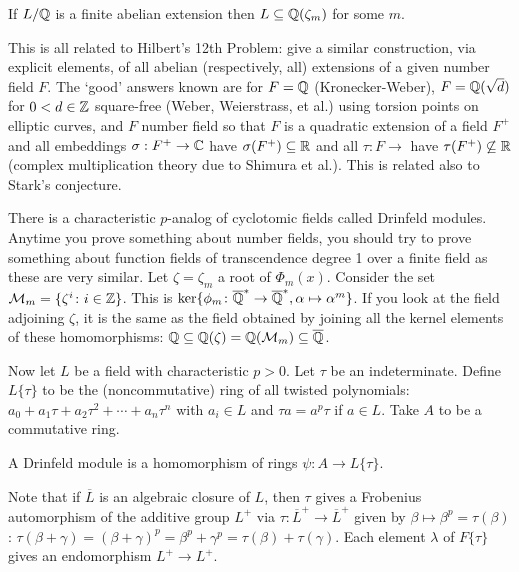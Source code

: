 \begin{thm}
If $L/\mathbb{Q}$ is a finite abelian extension then $L \subseteq \mathbb{Q}(\zeta_m)$ for some $m$.
\end{thm}


This is all related to Hilbert's 12th Problem: give a similar construction, via explicit elements, of all abelian (respectively, all) extensions of a given number field $F$. The `good' answers known are for $F=\mathbb{Q}$ (Kronecker-Weber), $F=\mathbb{Q}(\sqrt{d})$ for $0<d \in \mathbb{Z}$ square-free (Weber, Weierstrass, et al.) using torsion points on elliptic curves, and $F$ number field so that $F$ is a quadratic extension of a field $F^+$ and all embeddings $\sigma: F^+ \to \mathbb{C}$ have $\sigma(F^+) \subseteq \mathbb{R}$ and all $\tau: F \to$ have $\tau(F^+)\not\subseteq \mathbb{R}$ (complex multiplication theory due to Shimura et al.). This is related also to Stark's conjecture. 


There is a characteristic $p$-analog of cyclotomic fields called Drinfeld modules. Anytime you prove something about number fields, you should try to prove something about function fields of transcendence degree 1 over a finite field as these are very similar. Let $\zeta=\zeta_m$ a root of $\Phi_m(x)$. Consider the set $\mathcal{M}_m=\{\zeta^i \colon i \in \mathbb{Z}\}$. This is $\ker \{\phi_m \colon \overline{\mathbb{Q}}^* \to \overline{\mathbb{Q}}^*, \alpha \mapsto \alpha^m\}$. If you look at the field adjoining $\zeta$, it is the same as the field obtained by joining all the kernel elements of these homomorphisms: $\mathbb{Q} \subseteq \mathbb{Q}(\zeta)=\mathbb{Q}(\mathcal{M}_m) \subseteq \overline{\mathbb{Q}}$. 


Now let $L$ be a field with characteristic $p>0$. Let $\tau$ be an indeterminate. Define $L\{\tau\}$ to be the (noncommutative) ring of all twisted polynomials: $a_0+a_1 \tau + a_2\tau^2 + \cdots + a_n \tau^n$ with $a_i \in L$ and $\tau a=a^p \tau$ if $a \in L$. Take $A$ to be a commutative ring. 

\begin{dfn}
A Drinfeld module is a homomorphism of rings $\psi: A \to L\{\tau\}$. 
\end{dfn}

Note that if $\overline{L}$ is an algebraic closure of $L$, then $\tau$ gives a Frobenius automorphism of the additive group $L^+$ via $\tau: \overline{L}^+ \to \overline{L}^+$ given by $\beta \mapsto \beta^p=\tau(\beta)$: $\tau(\beta+\gamma)=(\beta+\gamma)^p=\beta^p+\gamma^p=\tau(\beta)+\tau(\gamma)$. Each element $\lambda$ of $F\{\tau\}$ gives an endomorphism $L^+ \to L^+$. 



